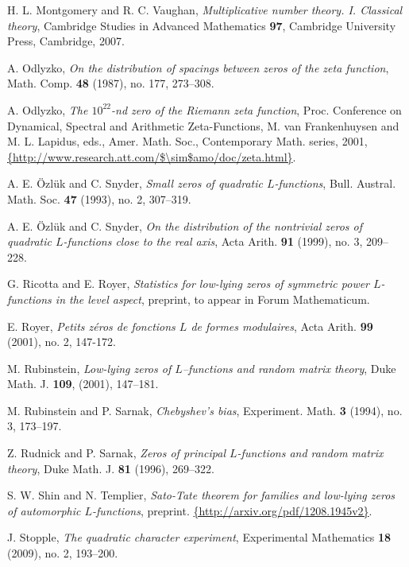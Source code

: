 \documentclass[12pt,reqno]{amsart}
\numberwithin{equation}{section}
\theoremstyle{plain}
\begin{document}
\begin{thebibliography}{GJMMNPPV}
 H. L. Montgomery and R. C. Vaughan, \emph{Multiplicative number theory. I. Classical theory}, Cambridge Studies in Advanced Mathematics \textbf{97}, Cambridge University Press, Cambridge, 2007.

\newblock A. Odlyzko, \emph{On the distribution of spacings
between zeros of the zeta function}, Math. Comp. \textbf{48} (1987),
no. 177, 273--308.

\newblock A. Odlyzko, \emph{The $10^{22}$-nd zero of the Riemann zeta function}, Proc.
Conference on Dynamical, Spectral and Arithmetic Zeta-Functions, M.
van Frankenhuysen and M. L. Lapidus, eds., Amer. Math. Soc.,
Contemporary Math. series, 2001,
{\textcolor{blue}{\url{{http://www.research.att.com/$\sim$amo/doc/zeta.html}}}}.

\newblock A. E. \"Ozl\"uk and C. Snyder, \emph{Small zeros of quadratic $L$-functions},
Bull. Austral. Math. Soc. \textbf{47} (1993), no. 2, 307--319.

\newblock A. E. \"Ozl\"uk and C. Snyder, \emph{On the distribution of the
nontrivial zeros of quadratic $L$-functions close to the real axis},
Acta Arith. \textbf{91} (1999), no. 3, 209--228.

\newblock G. Ricotta and E. Royer, \emph{Statistics for low-lying
zeros of symmetric power $L$-functions in the level aspect},
preprint, to appear in Forum Mathematicum.

\newblock E. Royer, \emph{Petits z\'{e}ros de fonctions $L$
de formes modulaires}, Acta Arith. \textbf{99} (2001),  no. 2,
147-172.

\newblock M. Rubinstein, \emph{Low-lying zeros of $L$--functions
and random matrix theory}, Duke Math. J. \textbf{109}, (2001),
147--181.

M. Rubinstein and P. Sarnak, \emph{Chebyshev's bias}, Experiment.
Math. \textbf{3} (1994), no. 3, 173--197.

\newblock Z. Rudnick and P. Sarnak, \emph{Zeros of principal $L$-functions
 and random matrix theory}, Duke Math. J. \textbf{81} (1996), 269--322.

S. W. Shin and N. Templier, \emph{Sato-Tate theorem for families and low-lying zeros of automorphic $L$-functions}, preprint.
{\textcolor{blue}{\url{{http://arxiv.org/pdf/1208.1945v2}}}}.

\newblock J. Stopple, \emph{The quadratic character experiment}, Experimental Mathematics \textbf{18} (2009), no. 2, 193--200.


\end{thebibliography}
\end{document}
